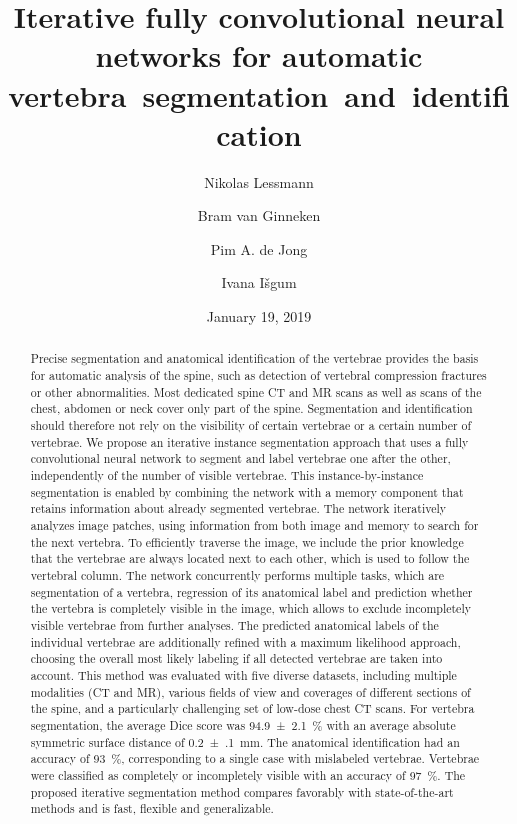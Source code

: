 \documentclass[authoryear,5p,final,times]{elsarticle}
\date{January 19, 2019}
\begin{document}
    \begin{frontmatter}
        \title{Iterative fully convolutional neural networks for automatic vertebra~segmentation~and~identification}

        \author[isi]{Nikolas Lessmann}
        \author[diag]{Bram van Ginneken}
        \author[rad,uu]{Pim A. de Jong}
        \author[isi]{Ivana I{\v{s}}gum}

        \address[isi]{Image Sciences Institute, University Medical Center Utrecht, The~Netherlands}
        \address[diag]{Diagnostic Image Analysis Group, Radboud University Medical Center Nijmegen, The~Netherlands}
        \address[rad]{Department of Radiology, University Medical Center Utrecht, The~Netherlands}
        \address[uu]{Utrecht University, The~Netherlands}

        \begin{abstract}
            Precise segmentation and anatomical identification of the vertebrae provides the basis for automatic analysis of the spine, such as detection of vertebral compression fractures or other abnormalities. Most dedicated spine CT and MR scans as well as scans of the chest, abdomen or neck cover only part of the spine. Segmentation and identification should therefore not rely on the visibility of certain vertebrae or a certain number of vertebrae. We propose an iterative instance segmentation approach that uses a fully convolutional neural network to segment and label vertebrae one after the other, independently of the number of visible vertebrae. This instance-by-instance segmentation is enabled by combining the network with a memory component that retains information about already segmented vertebrae. The network iteratively analyzes image patches, using information from both image and memory to search for the next vertebra. To efficiently traverse the image, we include the prior knowledge that the vertebrae are always located next to each other, which is used to follow the vertebral column. The network concurrently performs multiple tasks, which are segmentation of a vertebra, regression of its anatomical label and prediction whether the vertebra is completely visible in the image, which allows to exclude incompletely visible vertebrae from further analyses. The predicted anatomical labels of the individual vertebrae are additionally refined with a maximum likelihood approach, choosing the overall most likely labeling if all detected vertebrae are taken into account. This method was evaluated with five diverse datasets, including multiple modalities (CT and MR), various fields of view and coverages of different sections of the spine, and a particularly challenging set of low-dose chest CT scans. For vertebra segmentation, the average Dice score was \SI{94.9(21)}{\percent} with an average absolute symmetric surface distance of \SI{0.2(1)}{\milli\meter}. The anatomical identification had an accuracy of \SI{93}{\percent}, corresponding to a single case with mislabeled vertebrae. Vertebrae were classified as completely or incompletely visible with an accuracy of \SI{97}{\percent}. The proposed iterative segmentation method compares favorably with state-of-the-art methods and is fast, flexible and generalizable.

\end{abstract}
\end{frontmatter}
\end{document}
